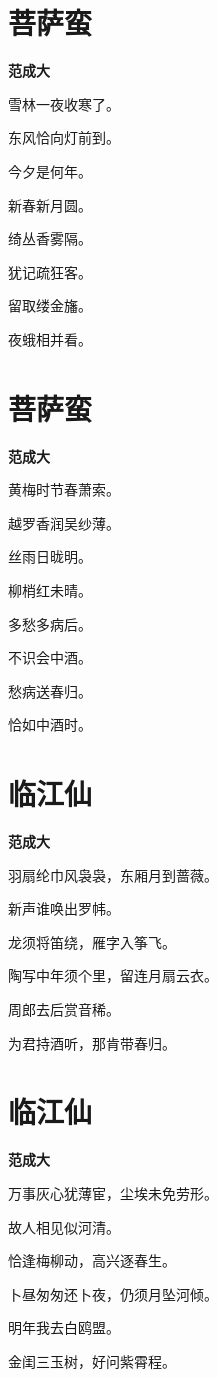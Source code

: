 \documentclass[12pt,a4paper]{ctexbook}
\begin{document}
\section{菩萨蛮}
\textbf{范成大}\par\vspace{0.5em}
雪林一夜收寒了。\par
东风恰向灯前到。\par
今夕是何年。\par
新春新月圆。\par
绮丛香雾隔。\par
犹记疏狂客。\par
留取缕金旛。\par
夜蛾相并看。\par

\section{菩萨蛮}
\textbf{范成大}\par\vspace{0.5em}
黄梅时节春萧索。\par
越罗香润吴纱薄。\par
丝雨日昽明。\par
柳梢红未晴。\par
多愁多病后。\par
不识会中酒。\par
愁病送春归。\par
恰如中酒时。\par

\section{临江仙}
\textbf{范成大}\par\vspace{0.5em}
羽扇纶巾风袅袅，东厢月到蔷薇。\par
新声谁唤出罗帏。\par
龙须将笛绕，雁字入筝飞。\par
陶写中年须个里，留连月扇云衣。\par
周郎去后赏音稀。\par
为君持酒听，那肯带春归。\par

\section{临江仙}
\textbf{范成大}\par\vspace{0.5em}
万事灰心犹薄宦，尘埃未免劳形。\par
故人相见似河清。\par
恰逢梅柳动，高兴逐春生。\par
卜昼匆匆还卜夜，仍须月坠河倾。\par
明年我去白鸥盟。\par
金闺三玉树，好问紫霄程。\par
\end{document}
